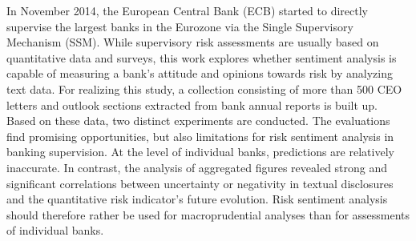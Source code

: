 In November 2014, the European Central Bank (ECB) started to directly supervise the largest banks in the Eurozone via the Single Supervisory Mechanism (SSM). While supervisory risk assessments are usually based on quantitative data and surveys, this work explores whether sentiment analysis is capable of measuring a bank's attitude and opinions towards risk by analyzing text data. For realizing this study, a collection consisting of more than 500 CEO letters and outlook sections extracted from bank annual reports is built up. Based on these data, two distinct experiments are conducted. The evaluations find promising opportunities, but also limitations for risk sentiment analysis in banking supervision. At the level of individual banks, predictions are relatively inaccurate. In contrast, the analysis of aggregated figures revealed strong and significant correlations between uncertainty or negativity in textual disclosures and the quantitative risk indicator's future evolution. Risk sentiment analysis should therefore rather be used for macroprudential analyses than for assessments of individual banks.
